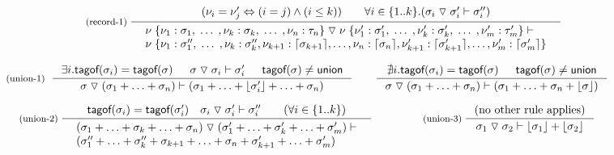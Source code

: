\documentclass[preprint]{sigplanconf}
\newcommand{\ident}[1]{\textnormal{\sffamily #1}}
\newcommand{\tsep}[0]{\; \triangledown \;}
\newcommand{\dropopt}[1]{\lfloor#1\rfloor}
\newcommand{\addopt}[1]{\lceil#1\rceil}
\newcommand{\tytagof}{\ident{tagof}}
\begin{document}
\begin{figure}[t]
\noindent
\begin{equation*}
\hspace{3em}
\inference[(record-1)\;]
  { (\nu_i = \nu'_j \Leftrightarrow (i = j) \wedge (i \leq k))
      \qquad \forall i\in\{ 1 .. k \}.(\sigma_i \tsep \sigma'_i \vdash \sigma''_i) }
  { \begin{array}{l}
    \nu \; \{ \nu_1 : \sigma_1,  \; \ldots \;, \nu_k : \sigma_k, \; \ldots \;, \nu_n : \tau_n \} \tsep
    \nu \; \{ \nu'_1 : \sigma'_1, \; \ldots \;, \nu'_k : \sigma'_k, \; \ldots \;, \nu'_m : \tau'_m \} \vdash\\
    \nu \; \{ \nu_1 : \sigma''_1, \; \ldots \; , \nu_k : \sigma''_k, 
                            \nu_{k+1} : \addopt{\sigma_{k+1}}, \ldots, \nu_n : \addopt{\sigma_n},
                            \nu'_{k+1} : \addopt{\sigma'_{k+1}}, \ldots, \nu'_m : \addopt{\sigma'_m} \}
    \end{array} }
\end{equation*}

\begin{equation*}
\textnormal{\footnotesize{(union-1)}}\;\;
\inference
  {\exists i . \tytagof(\sigma_i) = \tytagof(\sigma) & \sigma \tsep \sigma_i \vdash \sigma_i' & \tytagof(\sigma)\neq\ident{union}}
  {\sigma \tsep (\sigma_1 + \ldots + \sigma_n) \vdash (\sigma_1 + \ldots + \dropopt{\sigma_i'} + \ldots + \sigma_n)}
\quad\quad
\inference
  {\nexists i . \tytagof(\sigma_i) = \tytagof(\sigma) & \tytagof(\sigma)\neq\ident{union}}
  {\sigma \tsep (\sigma_1 + \ldots + \sigma_n) \vdash (\sigma_1 + \ldots + \sigma_n + \dropopt{\sigma})}
\end{equation*}

\begin{equation*}
\inference[(union-2)\;]
  { \tytagof(\sigma_i) = \tytagof(\sigma'_i) \quad 
    \sigma_i \tsep \sigma_i' \vdash \sigma''_i \qquad (\forall i\in \{ 1 .. k \}) }
  { \begin{array}{l}
    (\sigma_1  + \ldots + \sigma_k +  \ldots + \sigma_n) \tsep 
    (\sigma'_1 + \ldots + \sigma'_k + \ldots + \sigma'_m) \vdash\\
    (\sigma''_1 + \ldots + \sigma''_k + \sigma_{k+1} + \ldots + \sigma_{n} + \sigma'_{k+1} + \ldots + \sigma'_{m}) 
    \end{array} }
%
\qquad\quad
\inference[(union-3)\;]
  {(\textnormal{no other rule applies})}
  {\sigma_1 \tsep \sigma_2 \vdash \dropopt{\sigma_1} + \dropopt{\sigma_2}}
\end{equation*}


\end{figure}
\end{document}
